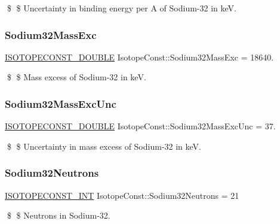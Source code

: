 \$ \$ Uncertainty in binding energy per A of Sodium-\/32 in keV. \mbox{\label{group___isotope_const-_sodium-_na32_gadf4726a6de8fd250abb20a40c302f6a8}} 
\subsubsection{\texorpdfstring{Sodium32\+Mass\+Exc}{Sodium32MassExc}}
{\footnotesize\ttfamily \mbox{\hyperlink{group___isotope_const-_macros_ga8f45a7272ce02c0b4c65c44636ed719a}{I\+S\+O\+T\+O\+P\+E\+C\+O\+N\+S\+T\+\_\+\+D\+O\+U\+B\+LE}} Isotope\+Const\+::\+Sodium32\+Mass\+Exc = 18640.}

\$ \$ Mass excess of Sodium-\/32 in keV. \mbox{\label{group___isotope_const-_sodium-_na32_ga3c076bb4c5945e5bef08e062afc75f53}} 
\subsubsection{\texorpdfstring{Sodium32\+Mass\+Exc\+Unc}{Sodium32MassExcUnc}}
{\footnotesize\ttfamily \mbox{\hyperlink{group___isotope_const-_macros_ga8f45a7272ce02c0b4c65c44636ed719a}{I\+S\+O\+T\+O\+P\+E\+C\+O\+N\+S\+T\+\_\+\+D\+O\+U\+B\+LE}} Isotope\+Const\+::\+Sodium32\+Mass\+Exc\+Unc = 37.}

\$ \$ Uncertainty in mass excess of Sodium-\/32 in keV. \mbox{\label{group___isotope_const-_sodium-_na32_gae7eb045e183d3c9f2039d83857efdfb4}} 
\subsubsection{\texorpdfstring{Sodium32\+Neutrons}{Sodium32Neutrons}}
{\footnotesize\ttfamily \mbox{\hyperlink{group___isotope_const-_macros_ga5f18360b3e99483a35c32d789e62621c}{I\+S\+O\+T\+O\+P\+E\+C\+O\+N\+S\+T\+\_\+\+I\+NT}} Isotope\+Const\+::\+Sodium32\+Neutrons = 21}

\$ \$ Neutrons in Sodium-\/32. \mbox{\label{group___isotope_const-_sodium-_na32_gae56a84145aab0f737b1445bbb1cd205d}} 
